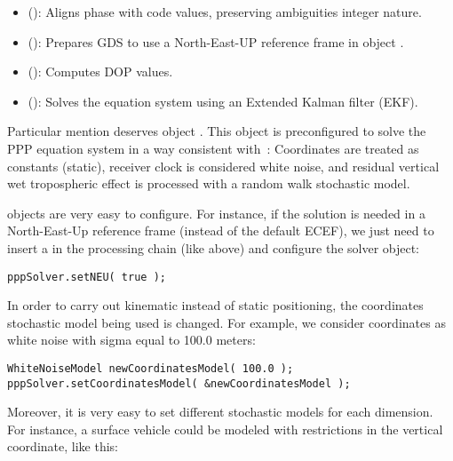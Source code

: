 \begin{itemize}
\item {} (): Aligns phase with code
values, preserving ambiguities integer nature.

\item {} (): Prepares GDS to use a
North-East-UP reference frame in object .

\item {} (): Computes DOP values.

\item {} (): Solves the equation system using
an Extended Kalman filter (EKF).
\end{itemize}

Particular mention deserves object . This object is preconfigured
to solve the PPP equation system in a way consistent with~\cite{ppp:kouba2001}:
Coordinates are treated as constants (static), receiver clock is considered
white noise, and residual vertical wet tropospheric effect is processed with a
random walk stochastic model.

 objects are very easy to configure. For instance, if the
solution is needed in a North-East-Up reference frame (instead of the default
ECEF), we just need to insert a  in the processing chain
(like  above) and configure the solver object:


\begin{scriptsize}
\begin{lstlisting}
pppSolver.setNEU( true );
\end{lstlisting}
\end{scriptsize}


In order to carry out kinematic instead of static positioning, the coordinates
stochastic model being used is changed. For example, we consider coordinates as
white noise with sigma equal to 100.0 meters:


\begin{scriptsize}
\begin{lstlisting}
WhiteNoiseModel newCoordinatesModel( 100.0 );
pppSolver.setCoordinatesModel( &newCoordinatesModel );
\end{lstlisting}
\end{scriptsize}


Moreover, it is very easy to set different stochastic models for each dimension.
For instance, a surface vehicle could be modeled with restrictions in the
vertical coordinate, like this:

